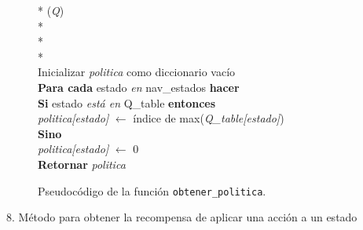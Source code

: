 \documentclass[conference,a4paper]{IEEEtran}
\begin{document}
\begin{figure}[h]
  \begin{pseudo}*
    (\textit{Q}) \\*
     \\*
     \\*
     \\
    Inicializar \textit{politica} como diccionario vacío \\
    \textbf{Para cada} estado \textit{en} nav\_estados \textbf{hacer} \\
    \> \textbf{Si} estado \textit{está en} Q\_table \textbf{entonces} \\
    \> \> \textit{politica[estado]} $\leftarrow$ índice de max(\textit{Q\_table[estado]}) \\
    \> \textbf{Sino} \\
    \> \> \textit{politica[estado]} $\leftarrow$ 0 \\
    \textbf{Retornar} \textit{politica}
  \end{pseudo}
  \caption{Pseudocódigo de la función \texttt{obtener\_politica}.}
  \label{fig:obtener_politica}
\end{figure}

8. Método para obtener la recompensa de aplicar una acción a un estado
\end{document}
